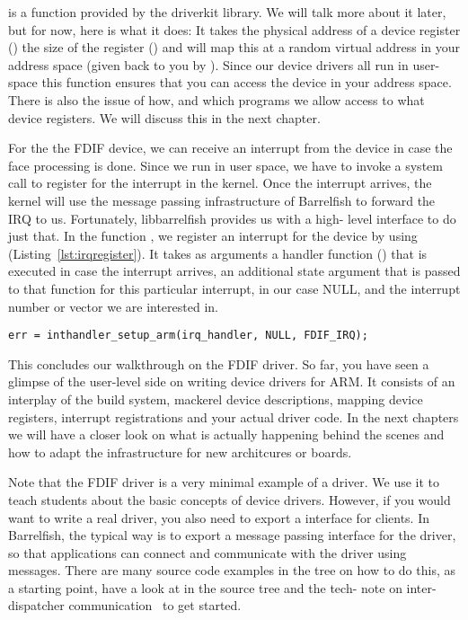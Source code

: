 \documentclass[a4paper,11pt,twoside]{report}
\begin{document}
 is a function provided by the driverkit
library. We will talk more about it later, but for now, here is what it does:
It takes the physical address of a device register () the
size of the register () and will map this at a random virtual
address in your address space (given back to you by ). Since
our device drivers all run in user-space this function ensures that you can
access the device in your address space. There is also the issue of how, and
which programs we allow access to what device registers. We will discuss this
in the next chapter.

For the the FDIF device, we can receive an interrupt from the device in case
the face processing is done. Since we run in user space, we have to invoke a
system call to register for the interrupt in the kernel. Once the interrupt
arrives, the kernel will use the message passing infrastructure of Barrelfish
to forward the IRQ to us. Fortunately, libbarrelfish provides us with a high-
level interface to do just that. In the function ,
we register an interrupt for the device by using
 (Listing~\ref{lst:irqregister}). It takes as
arguments a handler function () that is executed in case
the interrupt arrives, an additional state argument that is passed to that
function for this particular interrupt, in our case NULL, and the interrupt
number or vector we are interested in.

\begin{lstlisting}[caption={Register to receive an Interrupt.}, label={lst:irqregister}]
err = inthandler_setup_arm(irq_handler, NULL, FDIF_IRQ);
\end{lstlisting}

This concludes our walkthrough on the FDIF driver. So far, you have seen a
glimpse of the user-level side on writing device drivers for ARM. It consists
of an interplay of the build system, mackerel device descriptions,  mapping
device registers, interrupt registrations and your actual driver code. In the
next chapters we will have a closer look on what is actually happening behind
the scenes and how to adapt the infrastructure for new architcures or boards.

Note that the FDIF driver is a very minimal example of a driver. We use it to
teach students about the basic concepts of device drivers. However, if you
would want to write a real driver, you also need to export a interface for
clients. In Barrelfish, the typical way is to export a message passing
interface for the driver, so that applications can connect and communicate
with the driver using messages. There are many source code examples in the
tree on how to do this, as a starting point, have a look at
 in the source tree and the tech-
note on inter-dispatcher communication~\cite{btn011-idc} to get started.
\end{document}
